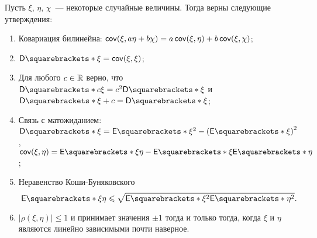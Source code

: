 \begin{lemma}
	Пусть \(\xi\), \(\eta\), \(\chi\)~--- некоторые случайные величины. Тогда верны следующие утверждения:
	\begin{enumerate}
		\item Ковариация билинейна: \(\operatorname{\mathsf{cov}}(\xi, a\eta + b\chi) = a\operatorname{\mathsf{cov}}(\xi, \eta) + b\operatorname{\mathsf{cov}}(\xi, \chi)\);
		\item \(\D{\xi} = \cov(\xi, \xi)\);
		\item Для любого \(c \in \mathbb{R}\) верно, что \(\D{c\xi} = c^2\D{\xi}\) и \(\D{\xi + c} = \D{\xi}\);
		\item Связь с матожиданием: \(\D{\xi} = \E{\xi^2} - \left(\E{\xi}\right)^2\), \(\cov(\xi, \eta) = \E{\xi\eta} - \E{\xi}\E{\eta}\);
		\item Неравенство Коши-Буняковского \[\E{\xi\eta} \leq \sqrt{\E{\xi^2}\E{\eta^2}}.\]
		\item \(\left|\rho(\xi, \eta)\right| \leq 1\) и принимает значения \(\pm 1\) тогда и только тогда, когда \(\xi\) и \(\eta\) являются линейно зависимыми почти наверное.
	\end{enumerate}
\end{lemma}
